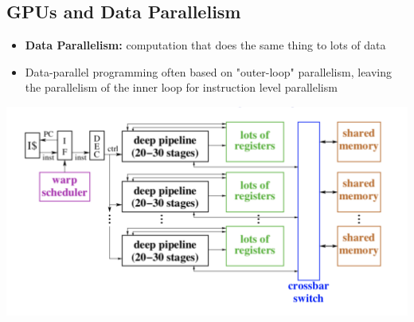 \documentclass[../main.tex]{subfiles}
\begin{document}
\subsection{GPUs and Data Parallelism}

\begin{itemize}
	\item \textbf{Data Parallelism:} computation that does the same thing to lots of data
	\item Data-parallel programming often based on "outer-loop" parallelism, leaving the parallelism of the inner loop for instruction level parallelism
\end{itemize}

\begin{center}
	\includegraphics[scale=0.35]{images/GPU.png}
\end{center}
\end{document}

